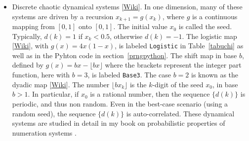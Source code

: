 \documentclass[oneside,10pt]{book}
\begin{document}
\begin{itemize}
\item Discrete chaotic \textcolor{index}{dynamical systems} [\href{https://en.wikipedia.org/wiki/Dynamical_system}{Wiki}].
 In one dimension, many of these systems are driven by a recursion $x_{k+1}=g(x_k)$, where $g$ is a continuous mapping from
$[0,1]$ onto $[0,1]$. The initial value $x_0$ is called the seed. Typically, $d(k)=1$ if $x_k<0.5$, otherwise $d(k)=-1$. The \textcolor{index}{logistic map} [\href{https://en.wikipedia.org/wiki/Logistic_map}{Wiki}], with $g(x)=4x(1-x)$, is labeled \texttt{Logistic} in Table~\ref{tabuchi} as well as in the Pyhton code
 in section~\ref{prngpython}. The \textcolor{index}{shift map} in base $b$, defined by $g(x)=bx-\lfloor bx\rfloor$ where the brackets represent the integer part function, here with $b=3$, is labeled
\texttt{Base3}. The case $b=2$ is known as the
 \textcolor{index}{dyadic map} [\href{https://en.wikipedia.org/wiki/Dyadic_transformation}{Wiki}].
The number $\lfloor bx_k\rfloor$
  is the $k$-digit of the seed $x_0$, in base $b>1$. In particular, if $x_0$ is a rational number, then the sequence
$\{d(k)\}$ is periodic, and thus non random. Even in the best-case scenario (using a random seed), the sequence $\{d(k)\}$ is auto-correlated. These dynamical systems are studied in detail in my book on probabilistic properties of numeration systems \cite{vgdyn}.


\end{itemize}
\end{document}
